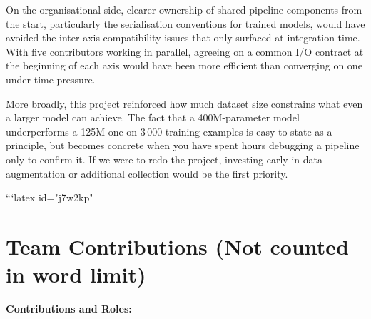 \documentclass[11pt,a4paper]{article}
\begin{document}
On the organisational side, clearer ownership of shared pipeline components
from the start, particularly the serialisation conventions for trained
models, would have avoided the inter-axis compatibility issues that only
surfaced at integration time. With five contributors working in parallel,
agreeing on a common I/O contract at the beginning of each axis would have
been more efficient than converging on one under time pressure.

More broadly, this project reinforced how much dataset size constrains what
even a larger model can achieve. The fact that a 400M-parameter model
underperforms a 125M one on 3\,000 training examples is easy to state as a
principle, but becomes concrete when you have spent hours debugging a
pipeline only to confirm it. If we were to redo the project, investing early
in data augmentation or additional collection would be the first priority.

```latex id="j7w2kp"
\section{Team Contributions (Not counted in word limit)}

\textbf{Contributions and Roles:}
\end{document}
